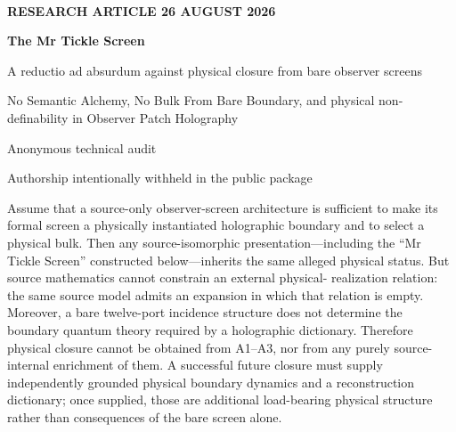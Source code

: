 \documentclass[10pt,a4paper]{article}
\theoremstyle{definition}
\theoremstyle{remark}
\begin{document}

\begin{titlepage}
\thispagestyle{empty}
\noindent{\color{DeepBlue}\rule{\textwidth}{1.2pt}}\\[7mm]
{\small\bfseries\color{DeepBlue} RESEARCH ARTICLE \hfill 26 AUGUST 2026}\\[12mm]
{\Huge\bfseries The Mr Tickle Screen\par}
\vspace{4mm}
{\Large A reductio ad absurdum against physical closure from bare observer screens\par}
\vspace{5mm}
{\large No Semantic Alchemy, No Bulk From Bare Boundary, and physical non-definability in Observer Patch Holography\par}
\vspace{12mm}
{\large Anonymous technical audit\par}
{\normalsize Authorship intentionally withheld in the public package\par}
\vspace{12mm}

\begin{summarybox}
Assume that a source-only observer-screen architecture is sufficient to make
its formal screen a physically instantiated holographic boundary and to select
a physical bulk.  Then any source-isomorphic presentation---including the
``Mr Tickle Screen'' constructed below---inherits the same alleged physical
status.  But source mathematics cannot constrain an external physical-
realization relation: the same source model admits an expansion in which that
relation is empty.  Moreover, a bare twelve-port incidence structure does not
determine the boundary quantum theory required by a holographic dictionary.
Therefore physical closure cannot be obtained from A1--A3, nor from any
purely source-internal enrichment of them.  A successful future closure must
supply independently grounded physical boundary dynamics and a reconstruction
dictionary; once supplied, those are additional load-bearing physical
structure rather than consequences of the bare screen alone.
\end{summarybox}


\end{titlepage}
\end{document}
